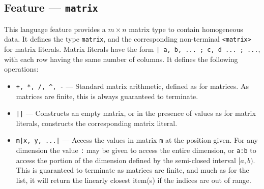\subsection{Feature --- \texttt{matrix}} %
\label{sub:feature_matrix}
This language feature provides a $m \times n$ matrix type to contain homogeneous data. 
It defines the type \texttt{matrix}, and the corresponding non-terminal \texttt{<matrix>} for matrix literals.
Matrix literals have the form \texttt{| a, b, ... ; c, d ... ; ...}, with each row having the same number of columns.
It defines the following operations:
\begin{itemize}
    \item \texttt{+, *, /, ^, -} --- Standard matrix arithmetic, defined as for matrices.
    As matrices are finite, this is always guaranteed to terminate.
    \item \texttt{||} --- Constructs an empty matrix, or in the presence of values as for matrix literals, constructs the corresponding matrix literal.
    \item \texttt{m|x, y, ...|} --- Access the values in matrix \texttt{m} at the position given. 
    For any dimension the value \texttt{:} may be given to access the entire dimension, or \texttt{a:b} to access the portion of the dimension defined by the semi-closed interval $[a,b)$.
    This is guaranteed to terminate as matrices are finite, and much as for the list, it will return the linearly closest item(s) if the indices are out of range.
\end{itemize}


